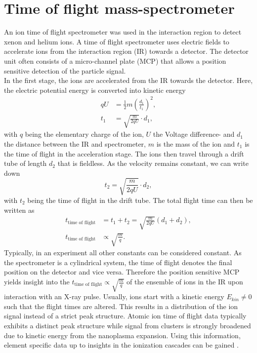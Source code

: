 \section{Time of flight mass-spectrometer}\label{sec:TOF-spectrometer}
An ion time of flight spectrometer was used in the interaction region to detect xenon and helium ions. A time of flight spectrometer uses electric fields to accelerate ions from the interaction region (IR) towards a detector. The detector unit often consists of a micro-channel plate (MCP) that allows a position sensitive detection of the particle signal.\\
In the first stage, the ions are accelerated from the IR towards the detector. Here, the electric potential energy is converted into kinetic energy
\begin{align}
q U &= \frac{1}{2}m \left(\frac{d_{1}}{t_{1}}\right)^{2},\\
t_{1} &= \sqrt{\frac{m}{2qU}}\cdot d_{1},
\end{align}
with $q$ being the elementary charge of the ion, $U$ the Voltage difference- and $d_{1}$ the distance between the IR and spectrometer, $m$ is the mass of the ion and $t_{1}$ is the time of flight in the acceleration stage. The ions then travel through a drift tube of length $d_{2}$ that is fieldless. As the velocity remains constant, we can write down
\begin{equation}
t_{2} = \sqrt{\frac{m}{2qU}}\cdot d_{2},
\end{equation}
with $t_{2}$ being the time of flight in the drift tube. The total flight time can then be written as
\begin{align}
t_{\text{time of flight}}&=t_{1}+t_{2}=\sqrt{\frac{m}{2 q U}} \left(d_{1}+d_{2}\right),\\
t_{\text{time of flight}} &\propto \sqrt{\frac{m}{q}}.
\end{align}
Typically, in an experiment all other constants can be considered constant. As the spectrometer is a cylindrical system, the time of flight denotes the final position on the detector and vice versa. Therefore the position sensitive MCP yields insight into the $t_{\text{time of flight}} \propto\sqrt{\frac{m}{q}}$ of the ensemble of ions in the IR upon interaction with an X-ray pulse. Usually, ions start with a kinetic energy $E_{kin}\neq 0$ such that the flight times are altered. This results in a distribution of the ion signal instead of a strict peak structure. Atomic ion time of flight data typically exhibits a distinct peak structure while signal from clusters is strongly broadened due to kinetic energy from the nanoplasma expansion. Using this information, element specific data up to insights in the ionization cascades can be gained \citep{Ho-2014-PRL}.\\

